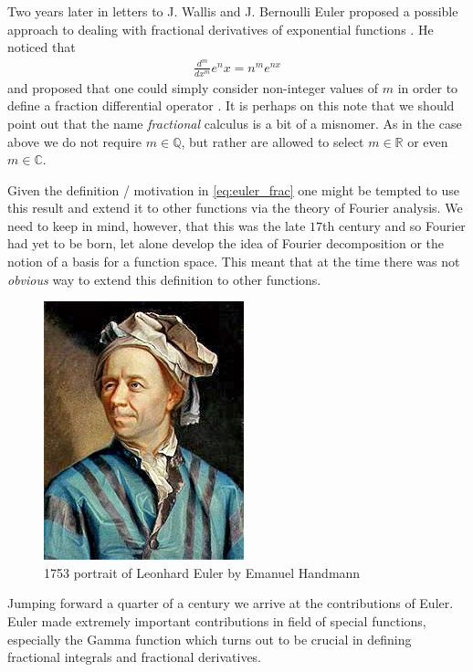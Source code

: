 Two years later in letters to J. Wallis and J. Bernoulli Euler proposed a possible approach to dealing with fractional derivatives of exponential functions \cite{Abbas2012}. He noticed that
\begin{align}
    \label{eq:euler_frac}
    \frac{d^m}{dx^m} e^nx = n^me^{nx} 
\end{align}
and proposed that one could simply consider non-integer values of $ m $ in order to define a fraction differential operator \cite{Samko1993}.
It is perhaps on this note that we should point out that the name \emph{fractional} calculus is a bit of a misnomer. As in the case above we do not require $ m \in \mathbb{Q} $, but rather are allowed to select $ m \in \mathbb{R} $ or even $ m \in \mathbb{C} $.

Given the definition / motivation in \eqref{eq:euler_frac} one might be tempted to use this result and extend it to other functions via the theory of Fourier analysis. We need to keep in mind, however, that this was the late $ 17$th century and so Fourier had yet to be born, let alone develop the idea of Fourier decomposition or the notion of a basis for a function space. This meant that at the time there was not \emph{obvious} way to extend this definition to other functions.

\begin{figure}
    \includegraphics[scale=0.8]{images/Leonhard_Euler}
    \caption{1753 portrait of Leonhard Euler by Emanuel Handmann}
\end{figure}

Jumping forward a quarter of a century we arrive at the contributions of Euler. Euler made extremely important contributions in field of special functions, especially the Gamma function which turns out to be crucial in defining fractional integrals and fractional derivatives.

